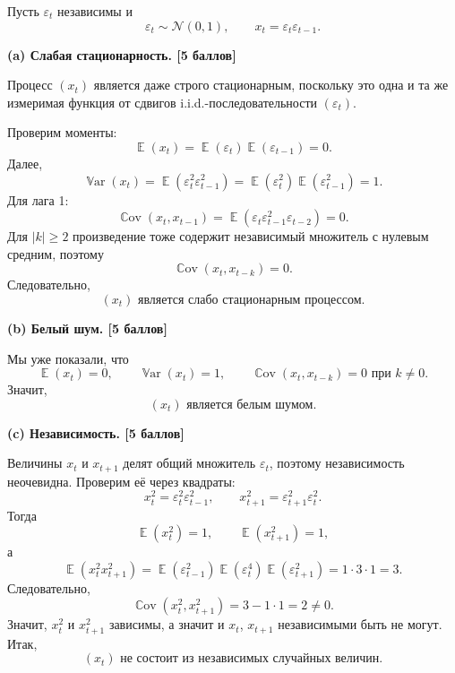 \documentclass[12pt]{article}
\DeclareMathOperator{\Cov}{\mathbb{C}ov}
\DeclareMathOperator{\Var}{\mathbb{V}ar}
\DeclareMathOperator{\E}{\mathbb{E}}
\newcommand \e{\varepsilon}
\newcommand \cN{\mathcal{N}}
\newcommand{\step}[1]{\medskip\noindent\textbf{#1}\par\nobreak\vspace{2pt}}
\begin{document}
Пусть $\e_t$ независимы и
\[
\e_t\sim\cN(0,1),\qquad x_t=\e_t\e_{t-1}.
\]

\step{(a) Слабая стационарность. \hfill [5 баллов]}
Процесс $(x_t)$ является даже строго стационарным, поскольку это одна и та же измеримая функция от сдвигов i.i.d.-последовательности $(\e_t)$.

Проверим моменты:
\[
\E(x_t)=\E(\e_t)\E(\e_{t-1})=0.
\]
Далее,
\[
\Var(x_t)=\E(\e_t^2\e_{t-1}^2)=\E(\e_t^2)\E(\e_{t-1}^2)=1.
\]
Для лага 1:
\[
\Cov(x_t,x_{t-1})=\E(\e_t\e_{t-1}^2\e_{t-2})=0.
\]
Для $|k|\ge 2$ произведение тоже содержит независимый множитель с нулевым средним, поэтому
\[
\Cov(x_t,x_{t-k})=0.
\]
Следовательно,
\[
\boxed{(x_t)\text{ является слабо стационарным процессом.}}
\]

\step{(b) Белый шум. \hfill [5 баллов]}
Мы уже показали, что
\[
\E(x_t)=0,\qquad \Var(x_t)=1,\qquad \Cov(x_t,x_{t-k})=0 \text{ при } k\ne 0.
\]
Значит,
\[
\boxed{(x_t)\text{ является белым шумом.}}
\]

\step{(c) Независимость. \hfill [5 баллов]}
Величины $x_t$ и $x_{t+1}$ делят общий множитель $\e_t$, поэтому независимость неочевидна. Проверим её через квадраты:
\[
x_t^2=\e_t^2\e_{t-1}^2,\qquad x_{t+1}^2=\e_{t+1}^2\e_t^2.
\]
Тогда
\[
\E(x_t^2)=1,\qquad \E(x_{t+1}^2)=1,
\]
а
\[
\E(x_t^2x_{t+1}^2)
=\E(\e_{t-1}^2)\E(\e_t^4)\E(\e_{t+1}^2)
=1\cdot 3\cdot 1=3.
\]
Следовательно,
\[
\Cov(x_t^2,x_{t+1}^2)=3-1\cdot 1=2\ne 0.
\]
Значит, $x_t^2$ и $x_{t+1}^2$ зависимы, а значит и $x_t$, $x_{t+1}$ независимыми быть не могут. Итак,
\[
\boxed{(x_t)\text{ не состоит из независимых случайных величин.}}
\]
\end{document}
